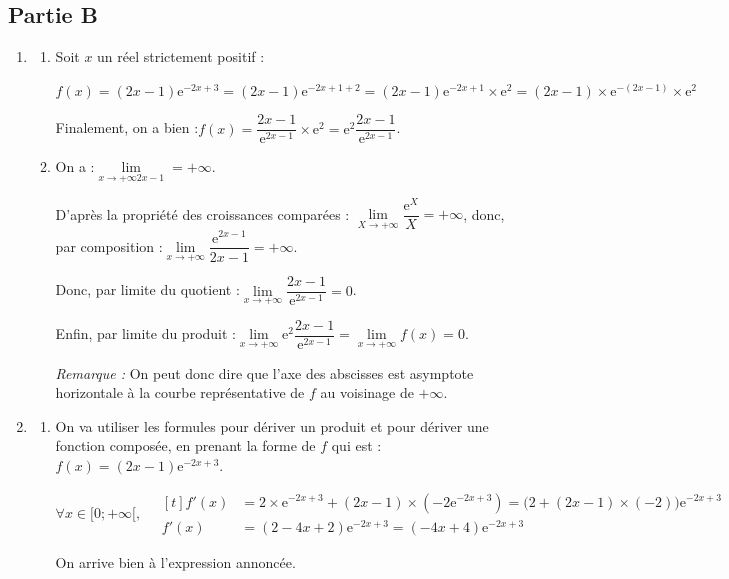 \documentclass[10pt]{article}
\providecommand{\e}{{\mathrm{e}}}
\begin{document}
\subsection*{Partie B}
	\begin{enumerate}
		\item \begin{enumerate}
			\item Soit $x$ un réel strictement positif :

			$f(x) = (2x - 1)\e^{-2x + 3}= (2x - 1)\e^{-2x + 1 + 2} = (2x - 1)\e^{-2x + 1}\times \e^{2} = (2x - 1)\times \e^{-(2x - 1)} \times \e^{2}$

			Finalement, on a bien :\quad $f(x) = \dfrac{2x - 1}{\e^{2x - 1}} \times \e^{2} = \e^{2}\dfrac{2x - 1}{\e^{2x - 1}}$.

			\item On a :\quad $\lim\limits_{x \to +\infty 2x - 1} = +\infty$.

			D'après la propriété des croissances comparées : \quad $\lim\limits_{X \to +\infty} \dfrac{\e^{X}}{X} = +\infty$, \quad donc, par composition :\quad $\lim\limits_{x \to +\infty} \dfrac{\e^{2x - 1}}{2x - 1}= + \infty$.

			Donc, par limite du quotient :\quad $\lim\limits_{x \to +\infty} \dfrac{2x - 1}{\e^{2x - 1}}= 0$.

			Enfin, par limite du produit :\quad $\lim\limits_{x \to +\infty} \e^{2}\dfrac{2x - 1}{\e^{2x - 1}} = \lim\limits_{x \to +\infty} f(x) = 0$.

			\emph{Remarque :} On peut donc dire que l'axe des abscisses est asymptote horizontale à la courbe représentative de $f$ au voisinage de $+\infty$.
		\end{enumerate}

		\item \begin{enumerate}
			\item On va utiliser les formules pour dériver un produit et pour dériver une fonction composée, en prenant la forme de $f$ qui est : \quad $f(x) = (2x-1)\e^{-2x+3}$.

			$\forall x \in [0 ; +\infty[,\quad \begin{aligned}[t]
			f'(x) &= 2 \times \e^{-2x + 3} + (2x-1) \times \left(-2\e^{-2x+3}\right) = \big(2 + (2x-1)\times(-2)\big)\e^{-2x+3} \\
			f'(x)&= (2 - 4x + 2)\e^{-2x+3} = (-4x+4)\e^{-2x+3}
			\end{aligned}$

			On arrive bien à l'expression annoncée.


\end{enumerate}
\end{enumerate}
\end{document}

